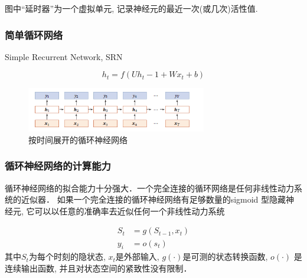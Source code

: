 \documentclass[a4paper]{article}
\theoremstyle{definition}
\numberwithin{equation}{section}
\begin{document}
图中“延时器”为一个虚拟单元, 记录神经元的最近一次(或几次)活性值.
\subsubsection{简单循环网络}
Simple Recurrent Network, SRN \citep{elman1990finding} 
 
$$h_t = f(Uh_t-1 +Wx_t + b)$$
\begin{figure}[!htb]
    \center
\includegraphics[width=0.7\textwidth]{simple_RNN.png}
\caption{按时间展开的循环神经网络}
\end{figure}


\subsubsection{循环神经网络的计算能力}
循环神经网络的拟合能力十分强大．一个完全连接的循环网络是任何非线性动力系统的近似器．
如果一个完全连接的循环神经网络有足够数量的sigmoid 型隐藏神经元, 它可以以任意的准确率去近似任何一个非线性动力系统

\begin{equation*}
    \begin{split}
        S_t &= g(S_{t-1}, x_t) \\
        y_i & = o(s_t)
    \end{split}
\end{equation*}
其中$S_t$为每个时刻的隐状态, $x_t$是外部输入, $g(\cdot)$是可测的状态转换函数, 
$o(\cdot)$ 是连续输出函数, 并且对状态空间的紧致性没有限制．
 
\end{document}
